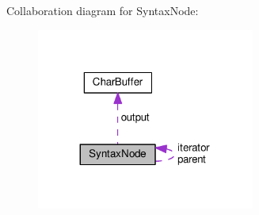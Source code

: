 Collaboration diagram for Syntax\+Node\+:
\nopagebreak
\begin{figure}[H]
\begin{center}
\leavevmode
\includegraphics[width=203pt]{dd/dfe/classSyntaxNode__coll__graph}
\end{center}
\end{figure}
